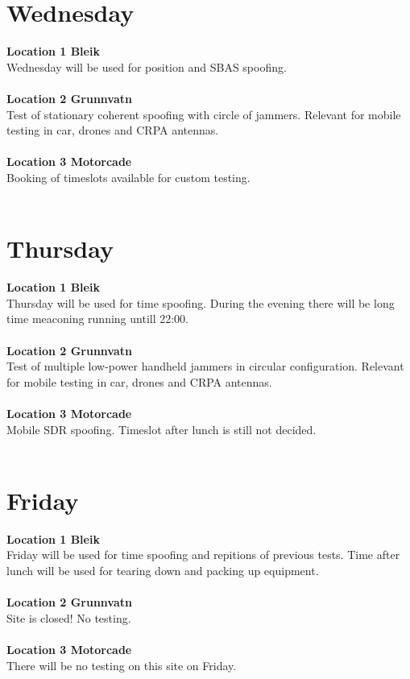 \documentclass[a4paper]{book}
\begin{document}
\begin{landscape}
\chapter{Wednesday}
\Large \textbf{Location 1 Bleik} \\
Wednesday will be used for position and SBAS spoofing. \\ \\
\Large \textbf{Location 2 Grunnvatn} \\
Test of stationary coherent spoofing with circle of jammers. Relevant for mobile testing in car, drones and CRPA antennas.\\ \\
\Large \textbf{Location 3 Motorcade} \\
Booking of timeslots available for custom testing.\\ \\

%

\chapter{Thursday}
\Large \textbf{Location 1 Bleik} \\
Thursday will be used for time spoofing. During the evening there will be long time meaconing running untill 22:00.\\ \\
\Large \textbf{Location 2 Grunnvatn} \\
Test of multiple low-power handheld jammers in circular configuration. Relevant for mobile testing in car, drones and CRPA antennas.\\ \\
\Large \textbf{Location 3 Motorcade} \\
Mobile SDR spoofing. Timeslot after lunch is still not decided.\\ \\

%

\chapter{Friday}
\Large \textbf{Location 1 Bleik} \\
Friday will be used for time spoofing and repitions of previous tests. Time after lunch will be used for tearing down and packing up equipment.\\ \\
\Large \textbf{Location 2 Grunnvatn} \\
Site is closed! No testing.\\ \\
\Large \textbf{Location 3 Motorcade} \\
There will be no testing on this site on Friday.\\ \\

%

\end{landscape}
\end{document}
